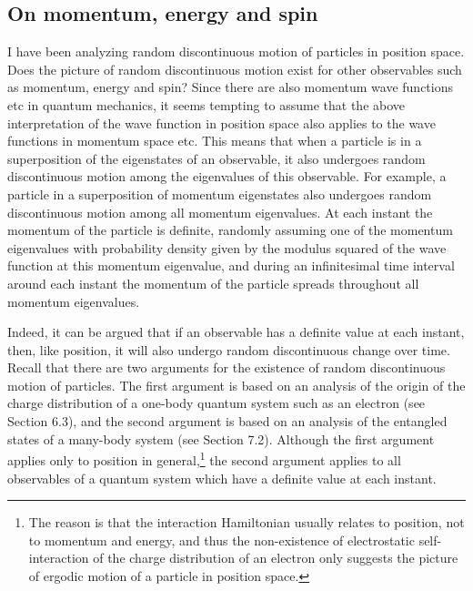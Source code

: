 \subsection{On momentum, energy and spin}

I have been analyzing random discontinuous motion of particles in position space. 
Does the picture of random discontinuous motion exist for other observables such as momentum, energy and spin? Since there are also momentum wave functions etc in quantum mechanics, it seems tempting to assume that the above interpretation of the wave function in position space also applies to the wave functions in momentum space etc.
This means that when a particle is in a superposition of the eigenstates of an observable, it also undergoes random discontinuous motion among the eigenvalues of this observable. 
For example, a particle in a superposition of momentum eigenstates also undergoes random discontinuous motion among all momentum eigenvalues. At each instant the momentum of the particle is definite, randomly assuming one of the momentum eigenvalues with probability density given by the modulus squared of the wave function at this momentum eigenvalue, and during an infinitesimal time interval around each instant the momentum of the particle spreads throughout all momentum eigenvalues.%

Indeed, it can be argued that if an observable has a definite value at each instant, then, like position, it will also undergo random discontinuous change over time. 
Recall that there are two arguments for the existence of random discontinuous motion of particles. 
The first argument is based on an analysis of the origin of the charge distribution of a one-body quantum system such as an electron (see Section 6.3), and the second argument is based on an analysis of the entangled states of a many-body system (see Section 7.2).
Although the first argument applies only to position in general,\footnote{The reason is that the interaction Hamiltonian usually relates to position, not to momentum and energy, and thus the non-existence of electrostatic self-interaction of the charge distribution of an electron only suggests the picture of ergodic motion of a particle in position space.} the second argument applies to all observables of a quantum system which have a definite value at each instant.

